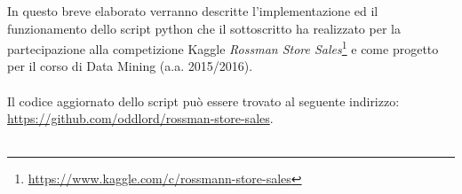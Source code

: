 In questo breve elaborato verranno descritte l'implementazione ed il funzionamento dello script python che il sottoscritto ha realizzato per la partecipazione alla competizione Kaggle \textit{Rossman Store Sales}\footnote{\url{https://www.kaggle.com/c/rossmann-store-sales}} e come progetto per il corso di Data Mining (a.a. 2015/2016).\\
\\
Il codice aggiornato dello script può essere trovato al seguente indirizzo: \url{https://github.com/oddlord/rossman-store-sales}.\\
\\
